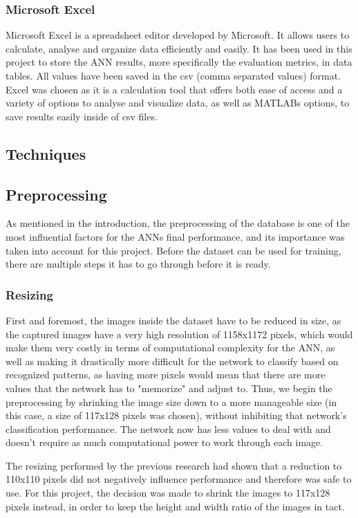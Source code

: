 \subsubsection{Microsoft Excel}
Microsoft Excel is a spreadsheet editor developed by Microsoft. It allows users to calculate, analyse and organize data efficiently and easily. \cite{excel:wiki} It has been used in this project to store the ANN results, more specifically the evaluation metrics, in data tables. All values have been saved in the csv (comma separated values) format. Excel was chosen as it is a calculation tool that offers both ease of access and a variety of options to analyse and visualize data, as well as MATLABs options, to save results easily inside of csv files.

\subsection{Techniques}

\subsection{Preprocessing}
As mentioned in the introduction, the preprocessing of the database is one of the most influential factors for the ANNs final performance, and its importance was taken into account for this project. Before the dataset can be used for training, there are multiple steps it has to go through before it is ready.

\subsubsection{Resizing}
First and foremost, the images inside the dataset have to be reduced in size, as the captured images have a very high resolution of 1158x1172 pixels, which would make them very costly in terms of computational complexity for the ANN, as well as making it drastically more difficult for the network to classify based on recognized patterns, as having more pixels would mean that there are more values that the network has to "memorize" and adjust to. Thus, we begin the preprocessing by shrinking the image size down to a more manageable size (in this case, a size of 117x128 pixels was chosen), without inhibiting that network's classification performance. The network now has less values to deal with and doesn't require as much computational power to work through each image. 

The resizing performed by the previous research \cite{skyClassANN-Granados-Lopéz} had shown that a reduction to 110x110 pixels did not negatively influence performance and therefore was safe to use. For this project, the decision was made to shrink the images to 117x128 pixels instead, in order to keep the height and width ratio of the images in tact.

